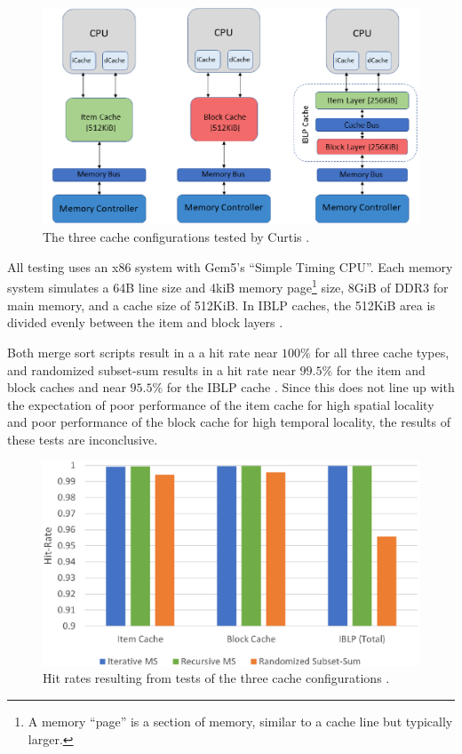 \documentclass[12pt,twoside]{reedthesis}
\begin{document}
	\begin{figure}[h]
		\centering
		\includegraphics[width=5in]{figures/curtis_caches.png}
		\caption{The three cache configurations tested by Curtis \cite{curtis}.}
	\end{figure}

	All testing uses an x86 system with Gem5's ``Simple Timing CPU''. Each memory system simulates a 64B line size and 4kiB memory page\footnote{A memory ``page'' is a section of memory, similar to a cache line but typically larger.} size, 8GiB of DDR3 for main memory, and a cache size of 512KiB. In IBLP caches, the 512KiB area is divided evenly between the item and block layers \cite{curtis}.

	Both merge sort scripts result in a a hit rate near $100\%$ for all three cache types, and randomized subset-sum results in a hit rate near $99.5\%$ for the item and block caches and near $95.5\%$ for the IBLP cache \cite{curtis}. Since this does not line up with the expectation of poor performance of the item cache for high spatial locality and poor performance of the block cache for high temporal locality, the results of these tests are inconclusive.

	\begin{figure}[H]
		\centering
		\includegraphics[height=2.4in]{figures/curtis_cache_hit_rates.png}
		\caption{Hit rates resulting from tests of the three cache configurations \cite{curtis}.}
	\end{figure}
\end{document}
